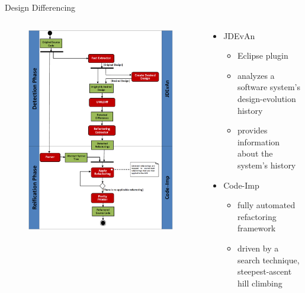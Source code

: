 \documentclass{beamer}
\begin{document}
\begin{frame}{Design Differencing}
  \begin{columns}
    \begin{column}{.4\textwidth}
      \begin{figure}[t]
        \centering
        \includegraphics[width=\linewidth]{bilder/designdiff.png}
      \end{figure}
    \end{column}
    \begin{column}{.6\textwidth}
      \begin{itemize}
        \item JDEvAn
        \begin{itemize}
          \item Eclipse plugin
          \item analyzes a software system’s design-evolution history
          \item provides information about the system’s history
        \end{itemize}
        \item Code-Imp
        \begin{itemize}
          \item fully automated refactoring framework
          \item driven by a search technique, steepest-ascent hill climbing
        \end{itemize}
      \end{itemize}
    \end{column}
  \end{columns} 
\end{frame}
\end{document}
